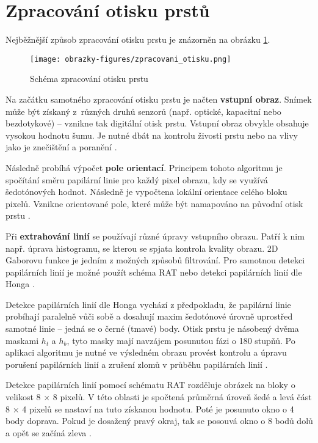 \section{Zpracování otisku prstů}
Nejběžnější způsob zpracování otisku prstu je znázorněn na obrázku \ref{fig:zpracovani}.\\

\begin{figure}[!htbp]
    \centering
    \texttt{[image: obrazky-figures/zpracovani\_otisku.png]}
    \caption{Schéma zpracování otisku prstu \cite{BIOopora}}
    \label{fig:zpracovani}
\end{figure}

Na začátku samotného zpracování otisku prstu je načten \textbf{vstupní obraz}. Snímek může být získaný z~různých druhů senzorů (např. optické, kapacitní nebo bezdotykové) -- vznikne tak digitální otisk prstu. Vstupní obraz obvykle obsahuje vysokou hodnotu šumu. Je nutné dbát na kontrolu živosti prstu nebo na vlivy jako je znečištění a poranění \cite{BIOopora}.

Následně probíhá výpočet \textbf{pole orientací}. Principem tohoto algoritmu je spočítání směru papilární linie pro každý pixel obrazu, kdy se využívá šedotónových hodnot. Následně je vypočtena lokální orientace celého bloku pixelů. Vznikne orientované pole, které může být namapováno na původní otisk prstu \cite{BIOopora}.

Při \textbf{extrahování linií} se používají různé úpravy vstupního obrazu. Patří k nim např. úprava histogramu, se kterou se spjata kontrola kvality obrazu. 2D Gaborovu funkce je jedním z možných způsobů filtrování. Pro samotnou detekci papilárních linií je možné použít schéma RAT nebo detekci papilárních linií dle Honga \cite{BIOopora}. 

Detekce papilárních linií dle Honga vychází z předpokladu, že papilární linie probíhají paralelně vůči sobě a dosahují maxim šedotónové úrovně uprostřed samotné linie -- jedná se o černé (tmavé) body. Otisk prstu je násobený dvěma maskami $h_t$ a $h_b$, tyto masky mají navzájem posunutou fázi o 180 stupňů. Po aplikaci algoritmu je nutné ve výsledném obrazu provést kontrolu a úpravu porušení papilárních linií a zrušení zlomů v průběhu papilárních linií \cite{BIOotiskyLecture}.

Detekce papilárních linií pomocí schématu RAT rozděluje obrázek na bloky o velikost 8 $\times$ 8 pixelů. V této oblasti je spočtená průměrná úroveň šedé a levá část 8 $\times$ 4 pixelů se nastaví na tuto získanou hodnotu. Poté je posunuto okno o 4 body doprava. Pokud je dosažený pravý okraj, tak se posouvá okno o 8 bodů dolů a opět se začíná zleva \cite{BIOopora}.

